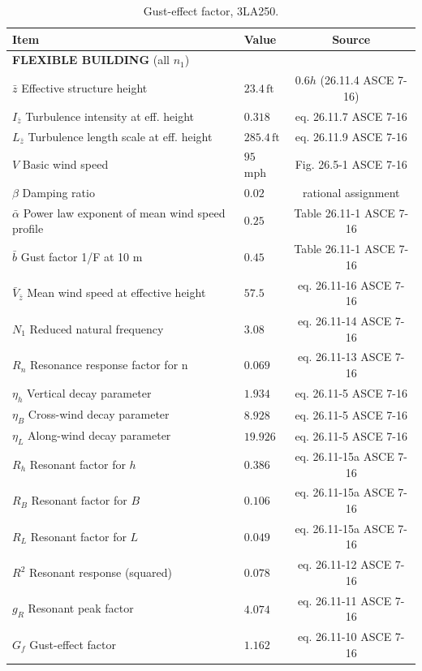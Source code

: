 \documentclass{simcenterdocumentation}
\newcommand{\ft}{\ensuremath{\,\mathrm{ft}}}
\begin{document}
\begin{table}[H]
\centering \caption{Gust-effect factor, 3LA250.}
\label{tab:gust_factor_3LA250}
\begin{tabular}{llc}
\toprule
Item		& Value		& Source		\\
\midrule
\multicolumn{3}{l}{\textbf{FLEXIBLE BUILDING} (all $n_1$)}	\\
$\bar{z}$ Effective structure height							& $23.4 \ft$					& $0.6h$ (26.11.4 ASCE 7-16)	\\
$I_{\bar{z}}$ Turbulence intensity at eff. height				& $0.318$						& eq. 26.11.7 ASCE 7-16			\\
$L_{\bar{z}}$ Turbulence length scale at eff. height			& $285.4 \ft$					& eq. 26.11.9 ASCE 7-16			\\
$V$ Basic wind speed											& $95$ mph						& Fig. 26.5-1 ASCE 7-16			\\
$\beta$ Damping ratio											& $0.02$						& rational assignment			\\
$\bar{\alpha}$ Power law exponent of mean wind speed profile	& $0.25$						& Table 26.11-1 ASCE 7-16		\\
$\bar{b}$ Gust factor 1/F at 10 m								& $0.45$						& Table 26.11-1 ASCE 7-16		\\
$\bar{V}_{\bar{z}}$ Mean wind speed at effective height			& $57.5$						& eq. 26.11-16 ASCE 7-16		\\
$N_1$ Reduced natural frequency									& $3.08$						& eq. 26.11-14 ASCE 7-16		\\
$R_n$ Resonance response factor for n							& $0.069$						& eq. 26.11-13 ASCE 7-16		\\
$\eta_h$ Vertical decay parameter								& $1.934$						& eq. 26.11-5 ASCE 7-16			\\
$\eta_B$ Cross-wind decay parameter								& $8.928$						& eq. 26.11-5 ASCE 7-16			\\
$\eta_L$ Along-wind decay parameter								& $19.926$						& eq. 26.11-5 ASCE 7-16			\\
$R_h$ Resonant factor for $h$									& $0.386$							& eq. 26.11-15a ASCE 7-16			\\
$R_B$ Resonant factor for $B$									& $0.106$							& eq. 26.11-15a ASCE 7-16			\\
$R_L$ Resonant factor for $L$									& $0.049$							& eq. 26.11-15a ASCE 7-16			\\
$R^2$ Resonant response (squared)								& $0.078$							& eq. 26.11-12 ASCE 7-16			\\
$g_R$ Resonant peak factor										& $4.074$							& eq. 26.11-11 ASCE 7-16			\\
$G_f$ Gust-effect factor										& $1.162$							& eq. 26.11-10 ASCE 7-16			\\
\bottomrule
\end{tabular}
\end{table}
\end{document}
